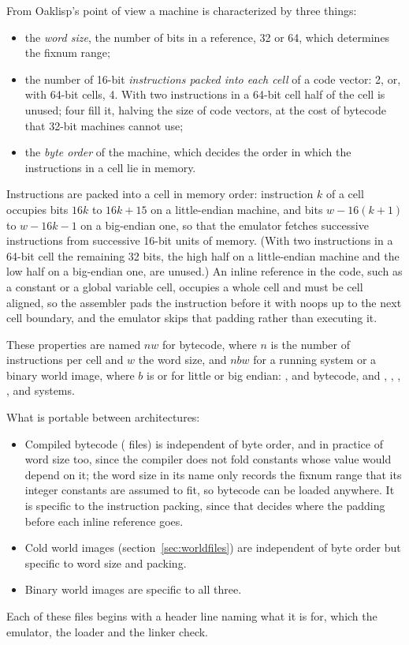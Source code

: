 From Oaklisp's point of view a machine is characterized by three
things:
\begin{itemize}
\item the \emph{word size}, the number of bits in a reference, 32 or
  64, which determines the fixnum range;
\item the number of 16-bit \emph{instructions packed into each cell}
  of a code vector: 2, or, with 64-bit cells, 4.  With two
  instructions in a 64-bit cell half of the cell is unused; four fill
  it, halving the size of code vectors, at the cost of bytecode that
  32-bit machines cannot use;
\item the \emph{byte order} of the machine, which decides the order in
  which the instructions in a cell lie in memory.
\end{itemize}

Instructions are packed into a cell in memory order: instruction $k$
of a cell occupies bits $16k$ to $16k+15$ on a little-endian machine,
and bits $w-16(k+1)$ to $w-16k-1$ on a big-endian one, so that the
emulator fetches successive instructions from successive 16-bit
units of memory.  (With two instructions in a 64-bit cell the
remaining 32 bits, the high half on a little-endian machine and the
low half on a big-endian one, are unused.)  An inline reference in
the code, such as a constant or a global variable cell, occupies a
whole cell and must be cell aligned, so the assembler pads the
instruction before it with noops up to the next cell boundary, and
the emulator skips that padding rather than executing it.

These properties are named $n$\df{-}$w$ for bytecode, where
$n$ is the number of instructions per cell and $w$ the word size, and
$n$$b$$w$ for a running system or a binary world image,
where $b$ is  or  for little or big endian:
,  and  bytecode, and ,
, , ,  and
 systems.

What is portable between architectures:
\begin{itemize}
\item Compiled bytecode ( files) is independent of byte order,
  and in practice of word size too, since the compiler does not fold
  constants whose value would depend on it; the word size in its name
  only records the fixnum range that its integer constants are assumed
  to fit, so  bytecode can be loaded anywhere.  It is
  specific to the instruction packing, since that decides where the
  padding before each inline reference goes.
\item Cold world images (section~\ref{sec:worldfiles}) are
  independent of byte order but specific to word size and packing.
\item Binary world images are specific to all three.
\end{itemize}
Each of these files begins with a header line naming what it is for,
which the emulator, the loader and the linker check.

